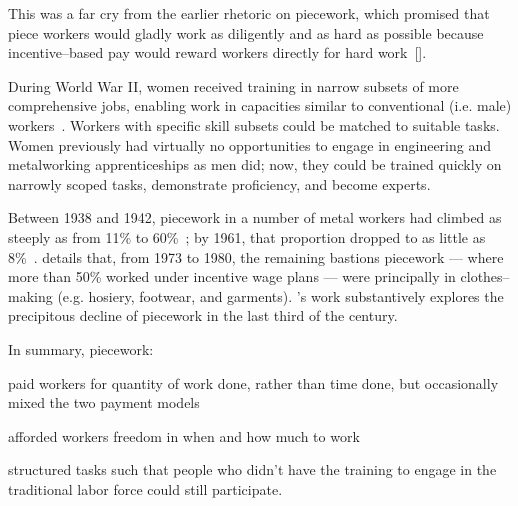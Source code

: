 \documentclass[trackingWork]{subfiles}
\begin{document}
This was a far cry from the earlier rhetoric on piecework, which promised that
piece workers would gladly work as diligently and as hard as possible because
incentive--based pay would reward workers directly for hard work~[].


During World War II, women received training in narrow subsets of more comprehensive jobs, enabling work in capacities similar to conventional (i.e. male) workers~\cite{hart2013rise}.
Workers with specific skill subsets could be matched to suitable tasks.
Women previously had virtually no opportunities
to engage in engineering and metalworking apprenticeships as men did;
now, they
could be trained quickly on narrowly scoped tasks,
demonstrate proficiency, and become experts.

Between 1938 and 1942, piecework in a number of metal workers had climbed as steeply as from 11\% to 60\%~\cite{hart2005piecework};
by 1961, that proportion dropped to as little as 8\%~\cite{carlson1982time}.
\citeauthor{carlson1982time} details that, from 1973 to 1980, the remaining bastions piecework
--- where more than 50\% worked under incentive wage plans ---
were principally in clothes--making (e.g. hosiery, footwear, and garments).
\citeauthor{hart2013rise}'s work substantively explores the precipitous decline of piecework in the last third of the  century.



In summary, piecework:
\begin{inlinelist}
  \item paid workers for quantity of work done, rather than time done,
        but occasionally mixed the two payment models
  \item afforded workers freedom in when and how much to work
  \item structured tasks such that people who didn't have the training
        to engage in the traditional labor force could still participate.
\end{inlinelist}
\end{document}
